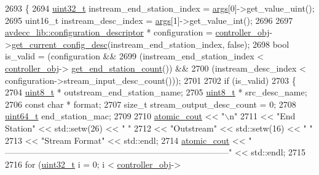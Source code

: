 \begin{DoxyCode}
2693 \{
2694     \hyperlink{parse_8c_a6eb1e68cc391dd753bc8ce896dbb8315}{uint32\_t} instream\_end\_station\_index = \hyperlink{namespaceastime__fitline_a8187411843a6284ffb964ef3fb9fcab3}{args}[0]->get\_value\_uint();
2695     uint16\_t instream\_desc\_index = \hyperlink{namespaceastime__fitline_a8187411843a6284ffb964ef3fb9fcab3}{args}[1]->get\_value\_int();
2696 
2697     \hyperlink{classavdecc__lib_1_1configuration__descriptor}{avdecc\_lib::configuration\_descriptor} * configuration = 
      \hyperlink{classcmd__line_af0a7784509e5bf1210a2aa19cea5df70}{controller\_obj}->\hyperlink{classavdecc__lib_1_1controller_af249ed146464b54d7fc9d87f67bcff46}{get\_current\_config\_desc}(instream\_end\_station\_index, \textcolor{keyword}{
      false});
2698     \textcolor{keywordtype}{bool} is\_valid = (configuration &&
2699                      (instream\_end\_station\_index < \hyperlink{classcmd__line_af0a7784509e5bf1210a2aa19cea5df70}{controller\_obj}->
      \hyperlink{classavdecc__lib_1_1controller_ab5ddf7b4a9718fe3e821289141f44485}{get\_end\_station\_count}()) &&
2700                      (instream\_desc\_index < configuration->stream\_input\_desc\_count()));
2701 
2702     \textcolor{keywordflow}{if} (is\_valid)
2703     \{
2704         \hyperlink{stdint_8h_aba7bc1797add20fe3efdf37ced1182c5}{uint8\_t} * outstream\_end\_station\_name;
2705         \hyperlink{stdint_8h_aba7bc1797add20fe3efdf37ced1182c5}{uint8\_t} * src\_desc\_name;
2706         \textcolor{keyword}{const} \textcolor{keywordtype}{char} * format;
2707         \textcolor{keywordtype}{size\_t} stream\_output\_desc\_count = 0;
2708         \hyperlink{parse_8c_aec6fcb673ff035718c238c8c9d544c47}{uint64\_t} end\_station\_mac;
2709 
2710         \hyperlink{cmd__line_8h_a0bc38ccc65c79ba06c6fcd7b4bf554c3}{atomic\_cout} << \textcolor{stringliteral}{"\(\backslash\)n"}
2711                     << \textcolor{stringliteral}{"End Station"} << std::setw(26) << \textcolor{stringliteral}{"   "}
2712                     << \textcolor{stringliteral}{"Outstream"} << std::setw(16) << \textcolor{stringliteral}{"   "}
2713                     << \textcolor{stringliteral}{"Stream Format"} << std::endl;
2714         \hyperlink{cmd__line_8h_a0bc38ccc65c79ba06c6fcd7b4bf554c3}{atomic\_cout} << \textcolor{stringliteral}{"
      ------------------------------------------------------------------------------"} << std::endl;
2715 
2716         \textcolor{keywordflow}{for} (\hyperlink{parse_8c_a6eb1e68cc391dd753bc8ce896dbb8315}{uint32\_t} i = 0; i < \hyperlink{classcmd__line_af0a7784509e5bf1210a2aa19cea5df70}{controller\_obj}->

\end{DoxyCode}
